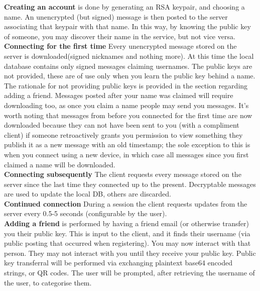 \textbf{Creating an account} is done by generating an RSA keypair, and choosing
a name. An unencrypted (but signed) message is then posted to the server
associating that keypair with that name. In this way, by knowing the public key
of someone, you may discover their name in the service, but not vice versa.\\

\textbf{Connecting for the first time} Every unencrypted message stored on the
server is downloaded(signed nicknames and nothing more). At this time the local
database contains only signed messages claiming usernames. The public keys are 
not provided, these are of use only when you learn the public key behind a name. 
The rationale for not providing public keys is provided in the section regarding 
adding a friend. Messages posted after your name was claimed will require 
downloading too, as once you claim a name people may send you messages. It's 
worth noting that messages from before you connected for the first time are now 
downloaded because they can not have been sent to you (with a compliment client) 
if someone retroactively grants you permission to view something they publish it 
as a new message with an old timestamp; the sole exception to this is when you 
connect using a new device, in which case all messages since you first claimed a 
name will be downloaded.\\

\textbf{Connecting subsequently} The client requests every message stored on the
server since the last time they connected up to the present. Decryptable
messages are used to update the local DB, others are discarded.\\

\textbf{Continued connection} During a session the client requests updates from
the server every 0.5-5 seconds (configurable by the user).\\

\textbf{Adding a friend} is performed by having a friend email (or otherwise
transfer) you their public key. This is input to the client, and it finds their
username (via public posting that occurred when registering). You may now
interact with that person. They may not interact with you until they receive
your public key. Public key transferral will be performed via exchanging plaintext
base64 encoded strings, or QR codes. The user will be prompted, after retrieving
the username of the user, to categorise them.\\

